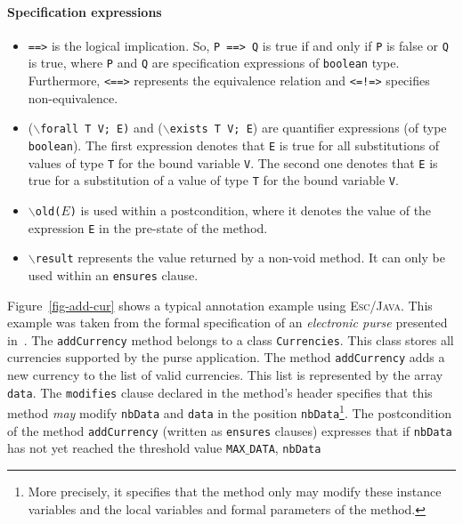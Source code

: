 \documentclass[a4paper]{llncs}
\newcommand{\escj}{\textsc{Esc/Java}}
\begin{document}
\paragraph{\bf Specification expressions} 
\begin{itemize} 
\item{\texttt{==>}} is the logical implication. So, \texttt{P 
==> Q} is true if and only if \texttt{P} is false or \texttt{Q} is 
true, where \texttt{P} and \texttt{Q} are specification expressions of  
\texttt{boolean} type. Furthermore, \texttt{<==>} represents the 
equivalence relation and \texttt{<=!=>} specifies non-equivalence. 
 
\item {($\backslash$\texttt{forall T V; E)} and 
($\backslash$\texttt{exists T V; E})} are quantifier expressions (of 
type \texttt{boolean}).  The first expression denotes that \texttt{E}
is true
for all substitutions of values of type \texttt{T} for the bound 
variable \texttt{V}. The second one denotes that \texttt{E} is true 
for a substitution of a value of type \texttt{T} for the bound 
variable \texttt{V}. 
 
\item{\texttt{$\backslash$old($E$)}} is used within a postcondition,
where it denotes the value of the expression \texttt{E} in the
pre-state of the method.
 
\item {\tt$\backslash$result} represents the value returned by 
a non-void method. It can only be used within an
\texttt{ensures} clause.
\end{itemize}
Figure~\ref{fig-add-cur} shows a typical annotation example using 
\escj. This example was taken from the formal specification of an
\emph{electronic purse} presented
in~\cite{CH01Url}. The \texttt{addCurrency}
method belongs
to a class \texttt{Currencies}. This class stores all currencies 
supported by the purse application. The method 
\texttt{addCurrency} adds a new currency to the list of valid 
currencies. This list is represented by the 
array \texttt{data}. The \texttt{modifies} clause declared in the 
method's header specifies that 
this method \emph{may} modify \texttt{nbData} and 
\texttt{data} in the position \texttt{nbData}\footnote{More precisely,
it specifies that the method only may modify these instance variables
and the local variables and formal parameters of the method.}. The
postcondition of the method \texttt{addCurrency} (written as 
\texttt{ensures} clauses) expresses that if \texttt{nbData} has not 
yet reached the threshold value \texttt{MAX$\_$DATA}, \texttt{nbData} 
\end{document}
